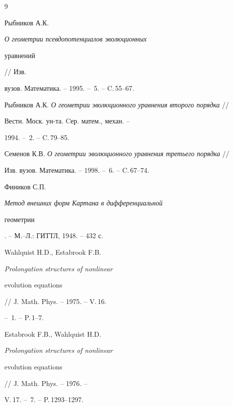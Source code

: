 \begin{thebibliography}{9}







Рыбников А.К. {\em О геометрии псевдопотенциалов эволюционных 


уравнений} // Изв.


вузов. Математика. -- 1995. -- \No\,5. -- C.\,55--67.




Рыбников А.К. {\em О геометрии эволюционного уравнения второго порядка} //


Вестн. Моск. ун-та. Cер. матем., механ. --


1994. -- \No\,2. -- C.\,79--85.




Семенов К.В. {\em О геометрии эволюционного уравнения третьего порядка} //


Изв. вузов. Математика. -- 1998. -- \No\,6. -- C.\,67--74.




Фиников С.П. {\em Метод внешних форм Картана в дифференциальной


геометрии}. -- М.--Л.: ГИТТЛ, 1948. -- 432 с.




Wahlquist H.D., Estabrook F.B. {\em Prolongation structures of nonlinear


evolution equations} // J. Math. Phys. -- 1975. -- V.\,16.


-- \No\,1. -- P.\,1--7.




Estabrook F.B., Wahlquist H.D. {\em Prolongation structures of nonlinear


evolution equations} // J. Math. Phys. -- 1976. --


V.\,17. -- \No\,7. -- P.\,1293--1297.





\end{thebibliography}





\vskip 0.5cm












\label{end}





